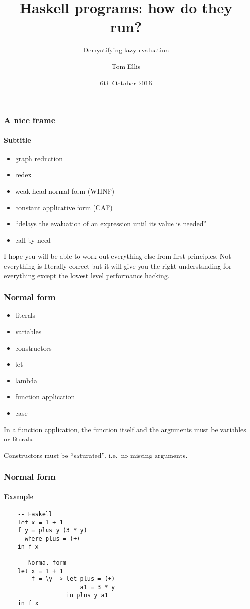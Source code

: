 \documentclass{beamer}
\title{Haskell programs: how do they run?}
\subtitle{Demystifying lazy evaluation}
\author{Tom Ellis}
\date{6th October 2016}
\begin{document}
\begin{frame}[t]
\titlepage
\end{frame}

\begin{frame}
\frametitle{A nice frame}
\framesubtitle{Subtitle}

\begin{itemize}
\item graph reduction
\item redex
\item weak head normal form (WHNF)
\item constant applicative form (CAF)
\item ``delays the evaluation of an expression until its value is needed''
\item call by need
\end{itemize}

I hope you will be able to work out everything else from first
principles.  Not everything is literally correct but it will give you
the right understanding for everything except the lowest level
performance hacking.

\end{frame}

\begin{frame}
  \frametitle{Normal form}

  \begin{itemize}
  \item literals
  \item variables
  \item constructors
  \item let
  \item lambda
  \item function application
  \item case
  \end{itemize}

  In a function application, the function itself and the arguments
  must be variables or literals.

  Constructors must be ``saturated'', i.e.\ no missing arguments.
\end{frame}

\begin{frame}[fragile]
  \frametitle{Normal form}
  \framesubtitle{Example}

  \begin{verbatim}
    -- Haskell
    let x = 1 + 1
    f y = plus y (3 * y)
      where plus = (+)
    in f x

    -- Normal form
    let x = 1 + 1
        f = \y -> let plus = (+)
                      a1 = 3 * y
                  in plus y a1
    in f x
  \end{verbatim}

\end{frame}
\end{document}
